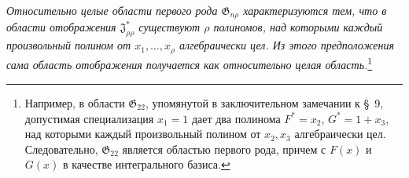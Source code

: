 \documentclass[11pt]{article}
\providecommand{\Jdom}{\mathfrak{J}}
\providecommand{\Gdom}{\mathfrak{G}}
\begin{document}
\emph{Относительно целые области первого рода $\Gdom_{n\rho}$ характеризуются тем, что в области отображения $\Jdom^*_{\rho\rho}$ существуют $\rho$ полиномов, над которыми каждый произвольный полином от $x_1,\ldots,x_\rho$ алгебраически цел. Из этого предположения сама область отображения получается как относительно целая область.}\footnote{Например, в области $\Gdom_{22}$, упомянутой в заключительном замечании к \S\ 9, допустимая специализация $x_1=1$ дает два полинома $F^*=x_2$, $G^*=1+x_3$, над которыми каждый произвольный полином от $x_2,x_3$ алгебраически цел. Следовательно, $\Gdom_{22}$ является областью первого рода, причем с $F(x)$ и $G(x)$ в качестве интегрального базиса.}
\end{document}
